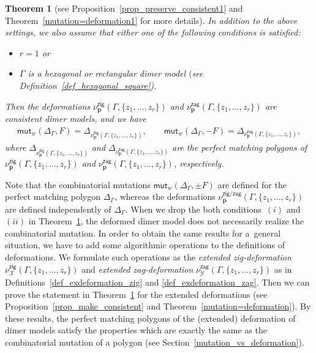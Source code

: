 \documentclass[pdftex]{sigma}%
\numberwithin{equation}{section}
\numberwithin{figure}{section}
\numberwithin{table}{section}
\newtheorem{Theorem}{Theorem}[section]
\newcommand{\calX}{\mathcal{X}}
\newcommand{\calY}{\mathcal{Y}}
\newcommand{\bfp}{\mathbf{p}}
\newcommand{\zig}{\mathsf{zig}}
\newcommand{\zag}{\mathsf{zag}}
\newcommand{\mutation}{\mathsf{mut}}
\begin{document}
\begin{Theorem}[{see Proposition~\ref{prop_preserve_consistent1} and Theorem~\ref{mutation=deformation1} for more details}]\label{thm_main_intro}
In addition to the above settings, we also assume that either one of the following conditions is satisfied:
\begin{itemize}\itemsep=0pt
\item[$(i)$] $r=1$ or
\item[$(ii)$] $\Gamma$ is a hexagonal or rectangular dimer model $($see Definition~{\rm \ref{def_hexagonal_square})}.
\end{itemize}
Then the deformations $\nu_\bfp^\zig(\Gamma,\{z_1,\dots,z_r\})$ and $\nu_\bfp^\zag(\Gamma,\{z_1,\dots,z_r\})$ are consistent dimer models,
and we have
\begin{gather*}\mutation_{w}(\Delta_\Gamma,F)=\Delta_{\nu^\zig_\bfp(\Gamma,\{z_1,\dots,z_r\})},\qquad
\mutation_{w}(\Delta_\Gamma,-F)=\Delta_{\nu^\zag_\bfp(\Gamma,\{z_1,\dots,z_r\})},
\end{gather*}
where $\Delta_{\nu^\zig_\bfp(\Gamma,\{z_1,\dots,z_r\})}$ and $\Delta_{\nu^\zag_\bfp(\Gamma,\{z_1,\dots,z_r\})}$ are the perfect matching polygons of
$\nu_\bfp^\zig(\Gamma,\{z_1,\dots,\allowbreak z_r\})$ and $\nu_\bfp^\zag(\Gamma,\{z_1,\dots,z_r\})$, respectively.
\end{Theorem}

Note that the combinatorial mutations $\mutation_{w}(\Delta_\Gamma,\pm F)$ are defined for the perfect matching polygon $\Delta_\Gamma$,
whereas the deformations $\nu^{\zig/\zag}_\bfp(\Gamma,\{z_1,\dots,z_r\})$ are defined independently of $\Delta_\Gamma$.
When we drop the both conditions~$(i)$ and $(ii)$ in Theorem~\ref{thm_main_intro}, the deformed dimer model does not necessarily realize the combinatorial mutation.
In order to obtain the same results for a~general situation, we have to add some algorithmic operations to the definitions of deformations.
We formulate such operations
as the \emph{extended zig-deformation} $\nu_\calX^\zig(\Gamma,\{z_1,\dots,z_r\})$ and \emph{extended zag-deformation} $\nu_\calY^\zag(\Gamma,\{z_1,\dots,z_r\})$ as in Definitions~\ref{def_exdeformation_zig} and \ref{def_exdeformation_zag}.
Then we can prove the statement in Theorem~\ref{thm_main_intro} for the extended deformations (see Proposition~\ref{prop_make_consistent} and Theorem~\ref{mutation=deformation}).
By these results, the perfect matching polygons of the (extended) deformation of dimer models satisfy
the properties which are exactly the same as the combinatorial mutation of a polygon (see Section~\ref{mutation_vs_deformation}).
\end{document}

